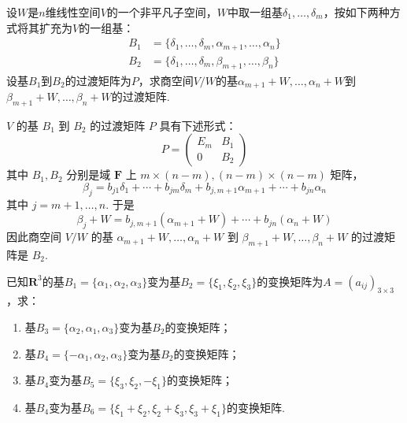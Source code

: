 \begin{exercise}
\begin{exgroup}
        \item 设$W$是$n$维线性空间$V$的一个非平凡子空间，$W$中取一组基$\delta_1,\ldots,\delta_m$，按如下两种方式将其扩充为$V$的一组基：
        \begin{align*}
            B_1 & =\{\delta_1,\ldots,\delta_m,\alpha_{m+1},\ldots,\alpha_n\} \\
            B_2 & =\{\delta_1,\ldots,\delta_m,\beta_{m+1},\ldots,\beta_n\}
        \end{align*}
        设基$B_1$到$B_2$的过渡矩阵为$P$，求商空间$V/W$的基$\alpha_{m+1}+W,\ldots,\alpha_n+W$到$\beta_{m+1}+W,\ldots,\beta_n+W$的过渡矩阵.
        \begin{answer}
            $V$ 的基 $B_1$ 到 $B_2$ 的过渡矩阵 $P$ 具有下述形式：
          \[P=\begin{pmatrix}E_m & B_1 \\ 0 & B_2\end{pmatrix}\]
          其中 $B_1,B_2$ 分别是域 $\mathbf{F}$ 上 $m\times (n-m),(n-m)\times (n-m)$ 矩阵，
          \[\beta_j=b_{j1}\delta_1+\cdots+b_{jm}\delta_m+b_{j,m+1}\alpha_{m+1}+\cdots+b_{jn}\alpha_n\]
          其中 $j=m+1,\ldots,n$. 于是
          \[\beta_j+W=b_{j,m+1}(\alpha_{m+1}+W)+\cdots+b_{jn}(\alpha_n+W)\]
          因此商空间 $V/W$ 的基 $\alpha_{m+1}+W,\ldots,\alpha_n+W$ 到 $\beta_{m+1}+W,\ldots,\beta_n+W$ 的过渡矩阵是 $B_2$.
        \end{answer}

        \item 已知$\mathbf{R}^3$的基$B_1=\{\alpha_1,\alpha_2,\alpha_3\}$变为基$B_2=\{\xi_1,\xi_2,\xi_3\}$的变换矩阵为$A=(a_{ij})_{3 \times 3}$，求：
        \begin{enumerate}
            \item 基$B_3=\{\alpha_2,\alpha_1,\alpha_3\}$变为基$B_2$的变换矩阵；

            \item 基$B_4=\{-\alpha_1,\alpha_2,\alpha_3\}$变为基$B_2$的变换矩阵；

            \item 基$B_4$变为基$B_5=\{\xi_3,\xi_2,-\xi_1\}$的变换矩阵；

            \item 基$B_4$变为基$B_6=\{\xi_1+\xi_2,\xi_2+\xi_3,\xi_3+\xi_1\}$的变换矩阵.
        \end{enumerate}


\end{exgroup}
\end{exercise}
